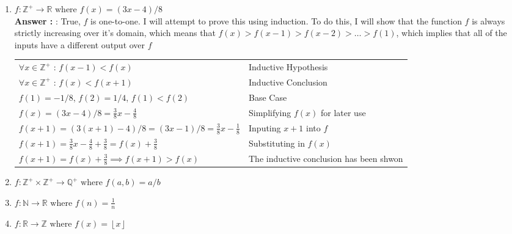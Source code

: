\documentclass[a4paper,11pt]{article}
\def\lf{\left\lfloor}
\def\rf{\right\rfloor}
\newcommand{\answer}{\textbf{Answer : }}
\begin{document}
\begin{enumerate}
    \begin{enumerate}
    \item $f : \mathbb{Z}^{+} \to \mathbb{R} \text{ where } f(x) = (3x-4)/8$ \\
    \answer : True, $f$ is one-to-one. I will attempt to prove this using induction. To do this, I will show that the function $f$ is always strictly increasing over it's domain, which means that $f(x) > f(x-1) > f(x-2) > \ldots > f(1)$, which implies that all of the inputs have a different output over $f$ \\[.15in]
        \begin{tabular}{l | l}
        $\forall x \in \mathbb{Z}^+$ : $f(x-1) < f(x)$                           & \quad Inductive Hypothesis \\
        $\forall x \in \mathbb{Z}^+$ : $f(x) < f(x+1)$                           & \quad Inductive Conclusion \\
        $f(1)= -1/8$, $f(2) = 1/4$, $f(1) < f(2)$                                & \quad Base Case \\
        $f(x) = (3x-4)/8 =  \frac{3}{8}x - \frac{4}{8}$                          & \quad Simplifying $f(x)$ for later use \\
        $f(x+1) = (3(x+1)-4)/8 = (3x - 1)/8 = \frac{3}{8}x - \frac{1}{8}$        & \quad Inputing $x+1$ into $f$ \\
        $f(x+1) = \frac{3}{8}x - \frac{4}{8} + \frac{3}{8} = f(x) + \frac{3}{8}$ & \quad Substituting in $f(x)$ \\
        $f(x+1) = f(x) + \frac{3}{8} \implies f(x+1) > f(x)$                     & \quad The inductive conclusion has been shwon \\[.1in]

        \end{tabular}

    \item $f : \mathbb{Z}^{+} \times \mathbb{Z}^+ \to \mathbb{Q}^+ \text{ where } f(a, b) = a/b$\\

    \item $f : \mathbb{N} \to \mathbb{R} \text{ where } f(n) = \frac{1}{n}$\\

    \item $f : \mathbb{R} \to \mathbb{Z} \text{ where } f(x) = \lf x \rf$\\

    \end{enumerate}



\end{enumerate}
\end{document}
